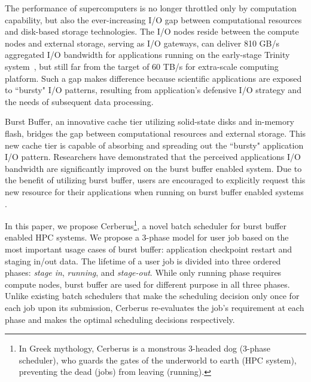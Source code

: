 The performance of supercomputers is no longer throttled only by computation capability,
but also the ever-increasing I/O gap 
between computational resources and disk-based storage technologies. 
The I/O nodes reside between the compute nodes and external storage, 
serving as I/O gateways, 
can deliver 810 GB/s aggregated I/O bandwidth for applications
running on the early-stage Trinity system~\cite{TrinitySystem}, 
but still far from the target of 60 TB/s for 
extra-scale computing platform\cite{Shalf:HPCCS:2010}.
Such a gap makes difference because scientific applications are exposed to
``bursty" I/O patterns\cite{Carns:MSST:2011, Kim:PDSW:2010},
resulting from application's
defensive I/O strategy\cite{Latham:CSD:2012, Naik:ICPPW:2009, Dennis:CUG:2009}
and the needs of subsequent data processing.


Burst Buffer, an innovative cache tier utilizing solid-state disks and in-memory flash, 
bridges the gap between computational resources and external storage.
This new cache tier is capable of absorbing and spreading out 
the ``bursty" application I/O pattern\cite{Bent:HBP:2011, Grider:EXA:2010}.
Researchers\cite{Liu:MSST:2012} have demonstrated that the perceived applications I/O
bandwidth are significantly improved on the burst buffer enabled system.
Due to the benefit of utilizing burst buffer,
users are encouraged to explicitly request this new resource for 
their applications when running on burst buffer enabled systems \cite{apex-workflow}.

In this paper, we propose Cerberus\footnote{In Greek mythology,
Cerberus is a monstrous 3-headed dog (3-phase scheduler),
who guards the gates of the underworld to earth (HPC system),
preventing the dead (jobs) from leaving (running).},
a novel batch scheduler for burst buffer enabled HPC systems. 
We propose a 3-phase model for user job 
based on the most important usage cases of burst buffer: 
application checkpoint restart and staging in/out data. 
The lifetime of a user job is divided into three ordered phases:
\textit{stage in}, \textit{running}, and \textit{stage-out}.
While only running phase requires compute nodes, burst buffer are used for different
purpose in all three phases.
Unlike existing batch schedulers that 
make the scheduling decision only once for each job upon its submission, 
Cerberus re-evaluates the job's requirement at each phase 
and makes the optimal scheduling decisions respectively.

